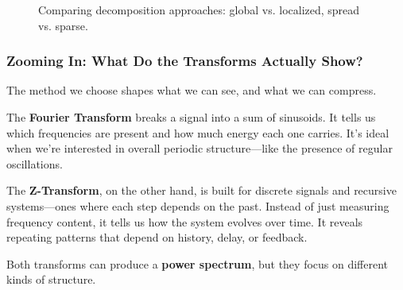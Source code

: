 \begin{figure}[H]
\caption{Comparing decomposition approaches: global vs. localized, spread vs. sparse.}
\end{figure}


\vspace{1em}
\subsubsection*{Zooming In: What Do the Transforms Actually Show?}

The method we choose shapes what we can see, and what we can compress.

The \textbf{Fourier Transform} breaks a signal into a sum of sinusoids. It tells us which frequencies are present and how much energy each one carries. It’s ideal when we’re interested in overall periodic structure—like the presence of regular oscillations.

The \textbf{Z-Transform}, on the other hand, is built for discrete signals and recursive systems—ones where each step depends on the past. Instead of just measuring frequency content, it tells us how the system evolves over time. It reveals repeating patterns that depend on history, delay, or feedback.

Both transforms can produce a \textbf{power spectrum}, but they focus on different kinds of structure.

\vspace{1em}

